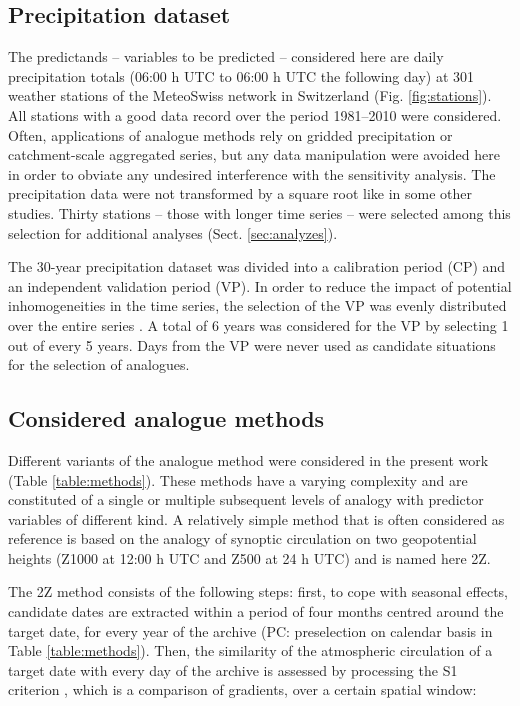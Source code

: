 \documentclass{ametsoc}
\begin{document}
\subsection{Precipitation dataset}
\label{sec:precip}

The predictands -- variables to be predicted -- considered here are daily precipitation totals (06:00 h UTC to 06:00 h UTC the following day) at 301 weather stations of the MeteoSwiss network in Switzerland (Fig. \ref{fig:stations}). All stations with a good data record over the period 1981--2010 were considered. Often, applications of analogue methods rely on gridded precipitation or catchment-scale aggregated series, but any data manipulation were avoided here in order to obviate any undesired interference with the sensitivity analysis. The precipitation data were not transformed by a square root like in some other studies. Thirty stations -- those with longer time series -- were selected among this selection for additional analyses (Sect. \ref{sec:analyzes}).

The 30-year precipitation dataset was divided into a calibration period (CP) and an independent validation period (VP). In order to reduce the impact of potential inhomogeneities in the time series, the selection of the VP was evenly distributed over the entire series \citep{BenDaoud2010}. A total of 6 years was considered for the VP by selecting 1 out of every 5 years. Days from the VP were never used as candidate situations for the selection of analogues.


\subsection{Considered analogue methods}
\label{sec:ams}

Different variants of the analogue method were considered in the present work (Table \ref{table:methods}). These methods have a varying complexity and are constituted of a single or multiple subsequent levels of analogy with predictor variables of different kind. A relatively simple method that is often considered as reference is based on the analogy of synoptic circulation on two geopotential heights (Z1000 at 12:00 h UTC and Z500 at 24 h UTC) and is named here 2Z.

The 2Z method consists of the following steps: first, to cope with seasonal effects, candidate dates are extracted within a period of four months centred around the target date, for every year of the archive (PC: preselection on calendar basis in Table \ref{table:methods}). Then, the similarity of the atmospheric circulation of a target date with every day of the archive is assessed by processing the S1 criterion \citep[Eq.\ \ref{eq:S1}, ][]{Teweles1954, Drosdowsky2003}, which is a comparison of gradients, over a certain spatial window:
\end{document}
